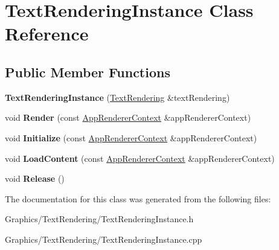 \hypertarget{classTextRenderingInstance}{}\section{Text\+Rendering\+Instance Class Reference}
\label{classTextRenderingInstance}
\subsection*{Public Member Functions}
\begin{DoxyCompactItemize}
\item 
\mbox{\label{classTextRenderingInstance_ad11bbc11333dcdac7970cda51b8a3882}} 
{\bfseries Text\+Rendering\+Instance} (\hyperlink{classTextRendering}{Text\+Rendering} \&text\+Rendering)
\item 
\mbox{\label{classTextRenderingInstance_a1dcbf17bf622012eedf5dde136c5966b}} 
void {\bfseries Render} (const \hyperlink{structAppRendererContext}{App\+Renderer\+Context} \&app\+Renderer\+Context)
\item 
\mbox{\label{classTextRenderingInstance_accd68d858d4eb97160e9ebaf01a6b5c8}} 
void {\bfseries Initialize} (const \hyperlink{structAppRendererContext}{App\+Renderer\+Context} \&app\+Renderer\+Context)
\item 
\mbox{\label{classTextRenderingInstance_a1cb7106b992e9cb3d8a3f811e08a8daf}} 
void {\bfseries Load\+Content} (const \hyperlink{structAppRendererContext}{App\+Renderer\+Context} \&app\+Renderer\+Context)
\item 
\mbox{\label{classTextRenderingInstance_a2e055800f40d3a43a4e744b73eae0464}} 
void {\bfseries Release} ()
\end{DoxyCompactItemize}


The documentation for this class was generated from the following files\+:\begin{DoxyCompactItemize}
\item 
Graphics/\+Text\+Rendering/Text\+Rendering\+Instance.\+h\item 
Graphics/\+Text\+Rendering/Text\+Rendering\+Instance.\+cpp\end{DoxyCompactItemize}
